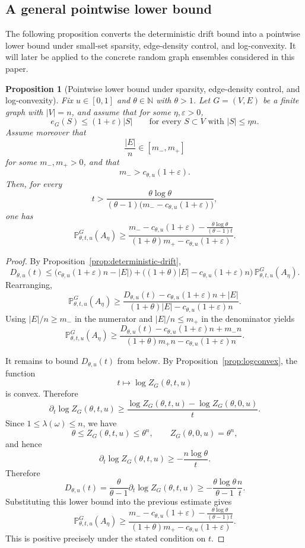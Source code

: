 \documentclass[11pt]{article}
\newtheorem{proposition}[theorem]{Proposition}
\theoremstyle{remark}
\theoremstyle{plain}
\newcommand{\Pbb}{\mathbb{P}}
\newcommand{\1}{\mathbbm{1}}
\begin{document}
\subsection{A general pointwise lower bound}
The following proposition converts the deterministic drift bound into a pointwise lower bound under small-set sparsity, edge-density control, and log-convexity. It will later be applied to the concrete random graph ensembles considered in this paper.
\begin{proposition}[Pointwise lower bound under sparsity, edge-density control, and log-convexity]
\label{prop:abstract-pointwise}
Fix \(u\in[0,1]\) and \(\theta\in\mathbb N\) with \(\theta>1\). Let \(G=(V,E)\) be a finite graph
with \(|V|=n\), and assume that for some \(\eta,\varepsilon>0\),
\[
e_G(S)\le (1+\varepsilon)|S|
\qquad\text{for every }S\subset V\text{ with }|S|\le \eta n.
\]
Assume moreover that
\[
\frac{|E|}{n}\in [m_-,m_+]
\]
for some \(m_-,m_+>0\), and that
\[
m_->c_{\theta,u}(1+\varepsilon).
\]
Then, for every
\[
t>
\frac{\theta\log\theta}{(\theta-1)\bigl(m_- - c_{\theta,u}(1+\varepsilon)\bigr)},
\]
one has
\[
\Pbb^G_{\theta,t,u}(A_\eta)
\ge
\frac{
m_- - c_{\theta,u}(1+\varepsilon)-\frac{\theta\log\theta}{(\theta-1)t}
}{
(1+\theta)m_+ - c_{\theta,u}(1+\varepsilon)
}.
\]
\end{proposition}

\begin{proof}
By Proposition~\ref{prop:deterministic-drift},
\[
D_{\theta,u}(t)
\le
\bigl(c_{\theta,u}(1+\varepsilon)n-|E|\bigr)
+
\bigl((1+\theta)|E|-c_{\theta,u}(1+\varepsilon)n\bigr)\,
\Pbb^G_{\theta,t,u}(A_\eta).
\]
Rearranging,
\[
\Pbb^G_{\theta,t,u}(A_\eta)
\ge
\frac{
D_{\theta,u}(t)-c_{\theta,u}(1+\varepsilon)n+|E|
}{
(1+\theta)|E|-c_{\theta,u}(1+\varepsilon)n
}.
\]
Using \(|E|/n\ge m_-\) in the numerator and \(|E|/n\le m_+\) in the denominator yields
\[
\Pbb^G_{\theta,t,u}(A_\eta)
\ge
\frac{
D_{\theta,u}(t)-c_{\theta,u}(1+\varepsilon)n+m_-n
}{
(1+\theta)m_+n-c_{\theta,u}(1+\varepsilon)n
}.
\]

It remains to bound \(D_{\theta,u}(t)\) from below. By Proposition~\ref{prop:logconvex}, the function
\[
t\longmapsto \log Z_G(\theta,t,u)
\]
is convex. Therefore
\[
\partial_t\log Z_G(\theta,t,u)
\ge
\frac{\log Z_G(\theta,t,u)-\log Z_G(\theta,0,u)}{t}.
\]
Since \(1\le \lambda(\omega)\le n\), we have
\[
\theta\le Z_G(\theta,t,u)\le \theta^n,
\qquad
Z_G(\theta,0,u)=\theta^n,
\]
and hence
\[
\partial_t\log Z_G(\theta,t,u)\ge -\frac{n\log\theta}{t}.
\]
Therefore
\[
D_{\theta,u}(t)
=
\frac{\theta}{\theta-1}\partial_t\log Z_G(\theta,t,u)
\ge
-\frac{\theta\log\theta}{\theta-1}\frac{n}{t}.
\]
Substituting this lower bound into the previous estimate gives
\[
\Pbb^G_{\theta,t,u}(A_\eta)
\ge
\frac{
m_- - c_{\theta,u}(1+\varepsilon)-\frac{\theta\log\theta}{(\theta-1)t}
}{
(1+\theta)m_+ - c_{\theta,u}(1+\varepsilon)
}.
\]
This is positive precisely under the stated condition on \(t\).
\end{proof}
\end{document}
